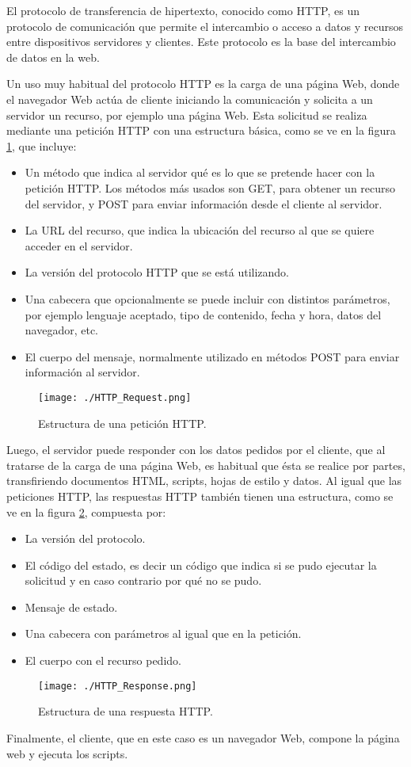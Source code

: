 El protocolo de transferencia de hipertexto, conocido como HTTP, es un protocolo de comunicación que permite el intercambio o acceso a datos y recursos entre dispositivos servidores y clientes. Este protocolo es la base del intercambio de datos en la web.
 
Un uso muy habitual del protocolo HTTP es la carga de una página Web, donde el navegador Web actúa de cliente iniciando la comunicación y solicita a un servidor un recurso, por ejemplo una página Web. Esta solicitud se realiza mediante una petición HTTP con una estructura básica, como se ve en la figura \ref{fig:HTTP_Req}, que incluye:
\begin{itemize}
	\item Un método que indica al servidor qué es lo que se pretende hacer con la petición HTTP. Los métodos más usados son GET, para obtener un recurso del servidor, y POST para enviar información desde el cliente al servidor.
	\item La URL del recurso, que indica la ubicación del recurso al que se quiere acceder en el servidor.
	\item La versión del protocolo HTTP que se está utilizando.
	\item Una cabecera que opcionalmente se puede incluir con distintos parámetros, por ejemplo lenguaje aceptado, tipo de contenido, fecha y hora, datos del navegador, etc. 
	\item El cuerpo del mensaje, normalmente utilizado en métodos POST para enviar información al servidor.
\end{itemize}

\begin{figure}[H]
	\centering
	\texttt{[image: ./HTTP\_Request.png]}
	\caption{Estructura de una petición HTTP.}
	\label{fig:HTTP_Req}
\end{figure}

Luego, el servidor puede responder con los datos pedidos por el cliente, que al tratarse de la carga de una página Web, es habitual que ésta se realice por partes, transfiriendo documentos HTML, scripts, hojas de estilo y datos.
Al igual que las peticiones HTTP, las respuestas HTTP también tienen una estructura, como se ve en la figura \ref{fig:HTTP_Resp}, compuesta por:

\begin{itemize}
	\item La versión del protocolo.
	\item El código del estado, es decir un código que indica si se pudo ejecutar la solicitud y en caso contrario por qué no se pudo.
	\item Mensaje de estado.
	\item Una cabecera con parámetros al igual que en la petición.
	\item El cuerpo con el recurso pedido.
\end{itemize}

\begin{figure}[H]
	\centering
	\texttt{[image: ./HTTP\_Response.png]}
	\caption{Estructura de una respuesta HTTP.}
	\label{fig:HTTP_Resp}
\end{figure}

Finalmente, el cliente, que en este caso es un navegador Web, compone la página web y ejecuta los scripts.


